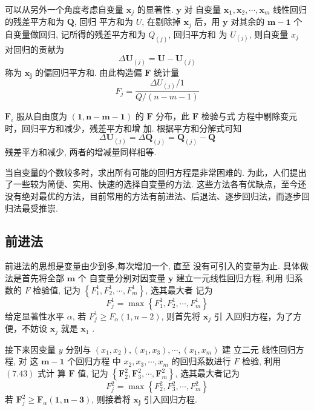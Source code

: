 可以从另外一个角度考虑自变量 \( \boldsymbol{x}_{j} \) 的显著性.  \( \boldsymbol{y} \) 对 自变量 \( \boldsymbol{x}_{\mathbf{1}}, \boldsymbol{x}_{2}, \cdots, \boldsymbol{x}_{m} \) 线性回归的残差平方和为 \( \boldsymbol{Q} \), 回归
平方和为 \( U \), 在剔除掉 \( \boldsymbol{x}_{j} \) 后，用 \( \boldsymbol{y} \) 对其余的 \( \boldsymbol{m}-\mathbf{1} \) 个自变量做回归, 记所得的残差平方和为 $ Q_{(j)} $, 回归平方和
为 \( U_{(j)} \), 则自变量 \( x_{j} \) 对回归的贡献为
$$
\Delta \boldsymbol{U}_{(j)}=\boldsymbol{U}-\boldsymbol{U}_{(j)}
$$
称为 \( \boldsymbol{x}_{\boldsymbol{j}} \) 的偏回归平方和. 由此构造偏 \( \boldsymbol{F} \) 统计量
$$
F_{j}=\frac{\Delta U_{(j)} / 1}{Q /(n-m-1)}
$$

\( \boldsymbol{F}_{i} \) 服从自由度为 \( (\mathbf{1}, \boldsymbol{n}-\boldsymbol{m}-\mathbf{1}) \) 的 \( \boldsymbol{F} \) 分布，此 \( \boldsymbol{F} \) 检验与式
方程中剔除变元时，回归平方和减少，残差平方和增 加. 根据平方和分解式可知
$$
\Delta \boldsymbol{U}_{(j)}=\Delta \boldsymbol{Q}_{(j)}=\boldsymbol{Q}_{(j)}-\boldsymbol{Q}
$$
残差平方和减少, 两者的增减量同样相等. 

当自变量的个数较多时，求出所有可能的回归方程是非常困难的. 为此，人们提出了一些较为简便、实用、快速的选择自变量的方法. 这些方法各有优缺点，至今还没有绝对最优的方法，目前常用的方法有前进法、后退法、逐步回归法，而逐步回归法最受推崇. 

\subsection{前进法}

前进法的思想是变量由少到多,每次增加一个, 直至
没有可引入的变量为止. 具体做法是首先将全部 \( \boldsymbol{m} \) 个 自变量分别对因变量 \( \boldsymbol{y} \) 建立一元线性回归方程, 利用
归系数的 \( F \) 检验值, 记为 \( \left\{F_{1}^{1}, F_{2}^{1}, \cdots, F_{m}^{1}\right\} \), 选其最大者 记为
$$
F_{j}^{1}=\max \left\{F_{1}^{1}, F_{2}^{1}, \cdots, F_{m}^{1}\right\}
$$
给定显著性水平 \( \alpha \), 若 \( F_{j}^{1} \geq F_{\alpha}(1, n-2) \), 则首先将 \( \boldsymbol{x}_{j} \) 引 入回归方程，为了方便，不妨设 \( \boldsymbol{x}_{j} \) 就是 \( \boldsymbol{x}_{1} \) . 

接下来因变量 \( y \) 分别与 \( \left(x_{1}, x_{2}\right),\left(x_{1}, x_{3}\right), \cdots,\left(x_{1}, x_{m}\right) \) 建
立二元 线性回归方程, 对 这 \( \boldsymbol{m}-\mathbf{1} \) 个回归方程 中 \( x_{2}, x_{3}, \cdots, x_{m} \) 的回归系数进行 \( F \) 检验, 利用 \( (7.43) \) 式计 算 \( \boldsymbol{F} \) 值, 记为 \( \left\{\boldsymbol{F}_{2}^{2}, \boldsymbol{F}_{3}^{2}, \cdots, \boldsymbol{F}_{m}^{2}\right\} \), 选其最大者记为
$$
F_{j}^{2}=\max \left\{F_{2}^{2}, F_{3}^{2}, \cdots, F_{m}^{2}\right\}
$$
若 \( \boldsymbol{F}_{j}^{2} \geq \boldsymbol{F}_{\alpha} \mathbf{( 1 , n - 3 )} \), 则接着将 \( \boldsymbol{x}_{\boldsymbol{j}} \) 引入回归方程. 

